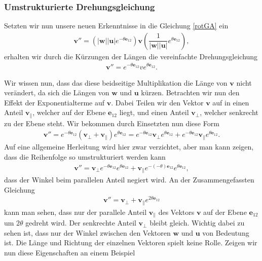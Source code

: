 \subsubsection{Umstrukturierte Drehungsgleichung}
Setzten wir nun unsere neuen Erkenntnisse in die Gleichung \eqref{rotGA} ein
\begin{align}
	\mathbf{v''} = (|\mathbf{w}||\mathbf{u}|e^{-\theta \mathbf{e}_{12}}) \mathbf{v}( \dfrac{1}{|\mathbf{w}||\mathbf{u}|}e^{\theta \mathbf{e}_{12}}),
\end{align}
erhalten wir durch die Kürzungen der Längen die vereinfachte Drehungsgleichung
\begin{align}
	\mathbf{v''} = e^{-\theta \mathbf{e}_{12}} v e^{\theta \mathbf{e}_{12}}.
\end{align}

Wir wissen nun, dass das diese beidseitige Multiplikation die Länge von $\mathbf{v}$ nicht verändert, da sich die Längen von $\mathbf{w}$ und $\mathbf{u}$ kürzen. Betrachten wir nun den Effekt der Exponentialterme auf $\mathbf{v}$. Dabei Teilen wir den Vektor $\mathbf{v}$ auf in einen Anteil $\mathbf{v_\parallel}$, welcher auf der Ebene $\mathbf{e}_{12}$ liegt, und einen Anteil $\mathbf{v_\perp}$, welcher senkrecht zu der Ebene steht. Wir bekommen durch Einsetzten nun diese Form
\begin{align} \label{RotAufPerpPar}
	\mathbf{v}'' = e^{-\theta \mathbf{e}_{12}} (\mathbf{v_\perp + v_\parallel}) e^{\theta \mathbf{e}_{12}} = e^{-\theta \mathbf{e}_{12}} \mathbf{v_\perp} e^{\theta \mathbf{e}_{12}} + e^{-\theta \mathbf{e}_{12}} \mathbf{v_\parallel} e^{\theta \mathbf{e}_{12}}.
\end{align}
Auf eine allgemeine Herleitung wird hier zwar verzichtet, aber man kann zeigen, dass die Reihenfolge so umstrukturiert werden kann
\begin{align}
	\mathbf{v}'' = \mathbf{v_\perp} e^{-\theta \mathbf{e}_{12}}  e^{\theta \mathbf{e}_{12}} +  \mathbf{v_\parallel} e^{-(-\theta) \mathbf{e}_{12}} e^{\theta \mathbf{e}_{12}},
\end{align}
dass der Winkel beim parallelen Anteil negiert wird. An der Zusammengefassten Gleichung
\begin{align}\label{RotParPerp}
	\mathbf{v}'' = \mathbf{v_\perp} +  \mathbf{v_\parallel} e^{2\theta \mathbf{e}_{12}}
\end{align}
kann man sehen, dass nur der parallele Anteil $\mathbf{v_\parallel}$ des Vektors $\mathbf{v}$ auf der Ebene $\mathbf{e}_{12}$ um $2\theta$ gedreht wird. Der senkrechte Anteil $\mathbf{v_\perp}$ bleibt gleich. Wichtig dabei zu sehen ist, dass nur der Winkel zwischen den Vektoren $\mathbf{w}$ und $\mathbf{u}$ von Bedeutung ist. Die Länge und Richtung der einzelnen Vektoren spielt keine Rolle. Zeigen wir nun diese Eigenschaften an einem Beispiel

